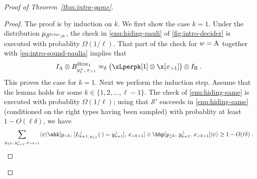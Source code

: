 \documentclass[11pt]{article}
\theoremstyle{definition}
\newcommand{\ket}[1]{|#1\rangle}
\newcommand{\bra}[1]{\langle#1|}
\newcommand{\Id}{\ensuremath{I}}
\newcommand{\ia}{\Id_\alice}
\newcommand{\ib}{\Id_\bob}
\newcommand{\sampler}{\mathcal{S}}
\newcommand{\strategy}{\mathscr{S}}
\newcommand{\gamestyle}[1]{\ensuremath{\textsc{#1}}\xspace}
\newcommand{\intro}{\gamestyle{Intro}}
\newcommand{\labelstyle}[1]{\ensuremath{\textsc{#1}}\xspace}
\newcommand{\alice}{\labelstyle{A}}
\newcommand{\bob}{\labelstyle{B}}
\newcommand{\typestyle}[1]{\ensuremath{\textsc{#1}}\xspace}
\newcommand{\Hide}[1]{\typestyle{Hide}_{#1}}
\begin{document}
\begin{proof}[Proof of Theorem~\ref{thm:intro-game}]
  \begin{proof}
    The proof is by induction on $k$. We first show the case $k=1$.
    Under the distribution $\mu_{\sampler^\intro,n}$, the check in
    \cref{enu:hiding-pauli} of \cref{fig:intro-decider} is executed with
    probablity $\Omega(1/\ell)$. That part of the check for $w=\alice$ together
    with \cref{eq:intro-sound-paulia} implies that
    \begin{equation}
      \label{eq:base-case-hide}
      \ia \otimes B^{\Hide{1}}_{y_1^\perp,\, x_{>1}} \approx_\delta \bigl(
      \xLperpk[1] \otimes \x[x_{>1}] \bigr) \otimes \ib\;.
    \end{equation}
    This proves the case for $k=1$.
    Next we perform the induction step.
    Assume that the lemma holds for some $k \in \{1, 2, \ldots, \ell-1\}$.
    The check of \cref{enu:hiding-same} is executed with probablity
    $\Omega(1/\ell)$; using that $\strategy'$ succeeds in \cref{enu:hiding-same}
    (conditioned on the right types having been sampled) with probablity at least $1 - O(\ell
    \delta)$, we have
    \begin{equation*}
      \sum_{y_{\le k},\, y^\perp_{k+1},\, x_{>k+1}}
      \bra{\psi} \ahk[{y_{<k},\, [L^\perp_{k+1,\, y_{\le k}}
      (\cdot ) = y^\perp_{k+1}],\, x_{>k+1}}] \otimes \bhp[y_{\le k},\,
      y^\perp_{k+1},\, x_{>k+1}] \ket{\psi} \ge 1 - O(\ell \delta)\;.
    \end{equation*}


\end{proof}
\end{proof}
\end{document}
